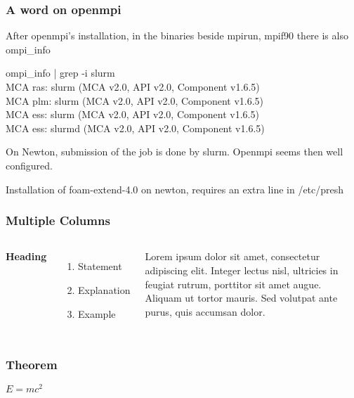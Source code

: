 \documentclass{beamer}
\begin{document}
\begin{frame}
\frametitle{A word on openmpi}

After openmpi's installation, in the binaries beside mpirun, mpif90 there is also ompi\_info

ompi\_info | grep -i slurm \\
MCA ras: slurm (MCA v2.0, API v2.0, Component v1.6.5) \\
MCA plm: slurm (MCA v2.0, API v2.0, Component v1.6.5) \\ 
MCA ess: slurm (MCA v2.0, API v2.0, Component v1.6.5) \\
MCA ess: slurmd (MCA v2.0, API v2.0, Component v1.6.5) 

On Newton, submission of the job is done by slurm. Openmpi seems then well configured.

Installation of foam-extend-4.0 on newton, requires an extra line in /etc/presh

\end{frame}




\begin{frame}
\frametitle{Multiple Columns}
\begin{columns}[c] %

\textbf{Heading}
\begin{enumerate}
\item Statement
\item Explanation
\item Example
\end{enumerate}

Lorem ipsum dolor sit amet, consectetur adipiscing elit. Integer lectus nisl, ultricies in feugiat rutrum, porttitor sit amet augue. Aliquam ut tortor mauris. Sed volutpat ante purus, quis accumsan dolor.

\end{columns}
\end{frame}


\begin{frame}
\frametitle{Theorem}
\begin{theorem}
$E = mc^2$
\end{theorem}
\end{frame}
\end{document}
